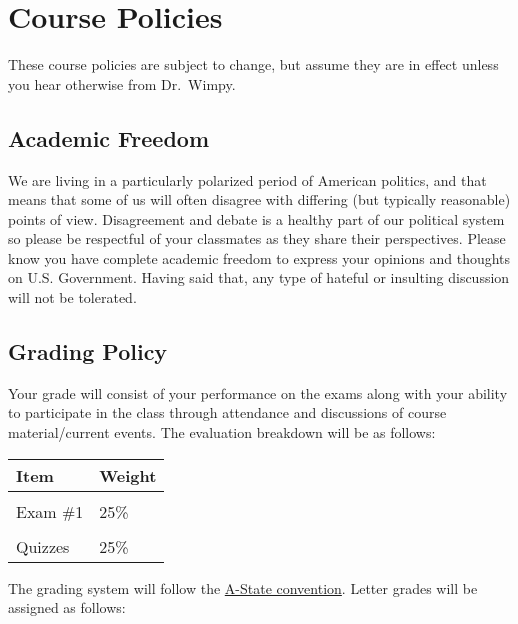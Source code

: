 \documentclass[11pt,]{article}
\begin{document}
\hypertarget{course-policies}{%
\section{Course Policies}\label{course-policies}}

These course policies are subject to change, but assume they are in
effect unless you hear otherwise from Dr.~Wimpy.

\hypertarget{academic-freedom}{%
\subsection{Academic Freedom}\label{academic-freedom}}

We are living in a particularly polarized period of American politics,
and that means that some of us will often disagree with differing (but
typically reasonable) points of view. Disagreement and debate is a
healthy part of our political system so please be respectful of your
classmates as they share their perspectives. Please know you have
complete academic freedom to express your opinions and thoughts on U.S.
Government. Having said that, any type of hateful or insulting
discussion will not be tolerated.

\hypertarget{grading-policy}{%
\subsection{Grading Policy}\label{grading-policy}}

Your grade will consist of your performance on the exams along with your
ability to participate in the class through attendance and discussions
of course material/current events. The evaluation breakdown will be as
follows:

\begin{table}
\centering
\begin{tabular}{ll}
\toprule
Item & Weight\\
\midrule
\cellcolor{gray!6}{Discussion} & \cellcolor{gray!6}{25\%}\\
Exam \#1 & 25\%\\
\cellcolor{gray!6}{Exam \#2} & \cellcolor{gray!6}{25\%}\\
Quizzes & 25\%\\
\bottomrule
\end{tabular}
\end{table}

The grading system will follow the
\href{https://www.astate.edu/college/graduate-school/academic-policies/}{A-State
convention}. Letter grades will be assigned as follows:
\end{document}
